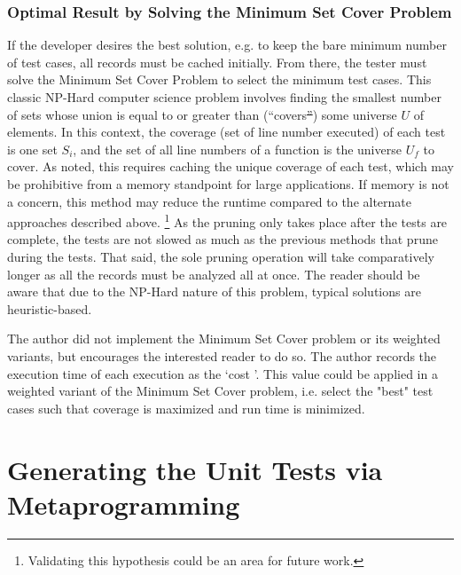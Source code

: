 \documentclass[10pt, conference]{IEEEtran}
\makeatletter
\providecommand{\DIFadd}[1]{{\protect\color{blue}\uwave{#1}}} %
\providecommand{\DIFdel}[1]{{\protect\color{red}\sout{#1}}} %
\providecommand{\DIFaddbegin}{} %
\providecommand{\DIFaddend}{} %
\providecommand{\DIFdelbegin}{} %
\providecommand{\DIFdelend}{} %
\newcommand{\DIFscaledelfig}{0.5}
\newlength{\DIFdelgraphicswidth} %
\newlength{\DIFdelgraphicsheight} %
\newcommand{\DIFaddincludegraphics}[2][]{{\color{blue}\fbox{\DIFOincludegraphics[#1]{#2}}}} %
\newcommand{\DIFdelincludegraphics}[2][]{%
\sbox{\DIFdelgraphicsbox}{\DIFOincludegraphics[#1]{#2}}%
\settoboxwidth{\DIFdelgraphicswidth}{\DIFdelgraphicsbox} %
\settoboxtotalheight{\DIFdelgraphicsheight}{\DIFdelgraphicsbox} %
\scalebox{\DIFscaledelfig}{%
\parbox[b]{\DIFdelgraphicswidth}{\usebox{\DIFdelgraphicsbox}\\[-\baselineskip] \rule{\DIFdelgraphicswidth}{0em}}\llap{\resizebox{\DIFdelgraphicswidth}{\DIFdelgraphicsheight}{%
\setlength{\unitlength}{\DIFdelgraphicswidth}%
\begin{picture}(1,1)%
\thicklines\linethickness{2pt} %
{\color[rgb]{1,0,0}\put(0,0){\framebox(1,1){}}}%
{\color[rgb]{1,0,0}\put(0,0){\line( 1,1){1}}}%
{\color[rgb]{1,0,0}\put(0,1){\line(1,-1){1}}}%
\end{picture}%
}\hspace*{3pt}}} %
} %
\DeclareRobustCommand{\DIFaddbegin}{\DIFOaddbegin \let\includegraphics\DIFaddincludegraphics} %
\DeclareRobustCommand{\DIFaddend}{\DIFOaddend \let\includegraphics\DIFOincludegraphics} %
\DeclareRobustCommand{\DIFdelbegin}{\DIFOdelbegin \let\includegraphics\DIFdelincludegraphics} %
\DeclareRobustCommand{\DIFdelend}{\DIFOaddend \let\includegraphics\DIFOincludegraphics} %
\let\sout@orig\sout %
\renewcommand{\sout}[1]{\ifmmode\text{\sout@orig{\ensuremath{#1}}}\else\sout@orig{#1}\fi} %
\makeatother
\begin{document}
\subsubsection{Optimal Result by Solving the Minimum Set Cover Problem}\label{sec:tuning-2}
If the developer desires the best solution, e.g. to keep the bare minimum
number of test cases, all records must be cached initially.  
From there, the tester must solve the Minimum Set Cover Problem
\cite{hassin2005better} to select the minimum test cases.
This classic NP-Hard computer science problem involves finding the smallest number
of sets whose union is equal to or greater than (“covers\DIFdelbegin \DIFdel{”}\DIFdelend \DIFaddbegin \DIFadd{"}\DIFaddend ) some universe $U$ of elements.  
In this context, the coverage (set of line number executed) of each test is one set $S_i$,
and the set of all line numbers of a function is the universe $U_f$ to cover.  
As noted, this requires caching the unique coverage of each test, which may 
be prohibitive from a memory standpoint for large applications.
If memory is not a concern, this method may reduce the runtime 
compared to the alternate approaches described above. \footnote{Validating this hypothesis
could be an area for future work.} As the pruning 
only takes place after the tests are complete, the tests are not slowed as much
as the previous methods that prune during the tests.  That said, the sole
pruning operation will take comparatively longer as all the records must be 
analyzed all at once. The reader should be aware that due to the NP-Hard
nature of this problem, typical solutions are heuristic-based.

The author did not implement 
the Minimum Set Cover problem or its weighted variants, but encourages 
the interested reader to do so.  The author records the execution time of each 
execution as the \lq cost \rq. This value could be applied in a weighted 
variant of the Minimum Set Cover problem, i.e. select the "best" test cases
such that coverage is maximized and run time is minimized.

\section{Generating the Unit Tests via Metaprogramming}\label{sec:generating-tests}
\end{document}
